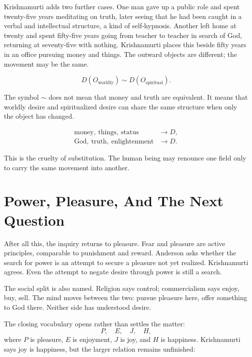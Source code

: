 \documentclass[11pt,oneside]{book}
\begin{document}
Krishnamurti adds two further cases. One man gave up a public role and spent twenty-five years meditating on truth, later seeing that he had been caught in a verbal and intellectual structure, a kind of self-hypnosis. Another left home at twenty and spent fifty-five years going from teacher to teacher in search of God, returning at seventy-five with nothing. Krishnamurti places this beside fifty years in an office pursuing money and things. The outward objects are different; the movement may be the same.

\begin{equation}
D(O_{\mathrm{worldly}})
\sim
D(O_{\mathrm{spiritual}}).
\end{equation}

The symbol \(\sim\) does not mean that money and truth are equivalent. It means that worldly desire and spiritualized desire can share the same structure when only the object has changed.

\begin{align}
\mathrm{money,\ things,\ status} &\longrightarrow D,\\
\mathrm{God,\ truth,\ enlightenment} &\longrightarrow D.
\end{align}

This is the cruelty of substitution. The human being may renounce one field only to carry the same movement into another.

\section{Power, Pleasure, And The Next Question}

After all this, the inquiry returns to pleasure. Fear and pleasure are active principles, comparable to punishment and reward. Anderson asks whether the search for power is an attempt to secure a pleasure not yet realized. Krishnamurti agrees. Even the attempt to negate desire through power is still a search.

The social split is also named. Religion says control; commercialism says enjoy, buy, sell. The mind moves between the two: pursue pleasure here, offer something to God there. Neither side has understood desire.

The closing vocabulary opens rather than settles the matter:
\begin{equation}
P,\quad E,\quad J,\quad H,
\end{equation}
where \(P\) is pleasure, \(E\) is enjoyment, \(J\) is joy, and \(H\) is happiness. Krishnamurti says joy is happiness, but the larger relation remains unfinished:
\end{document}
